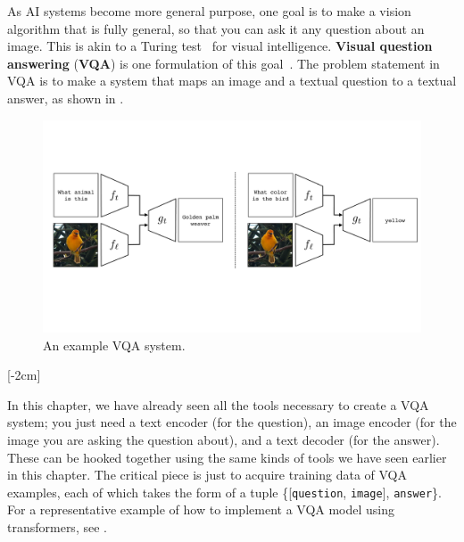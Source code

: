 As AI systems become more general purpose, one goal is to make a vision algorithm that is fully general, so that you can ask it any question about an image. This is akin to a Turing test~\cite{turing2009computing} for visual intelligence. \textbf{Visual question answering} (\textbf{VQA}) is one formulation of this goal~\cite{antol2015vqa}. The problem statement in VQA is to make a system that maps an image and a textual question to a textual answer, as shown in \fig{\ref{fig:vision_and_language:VQA_examples}}.
\begin{figure}
    \centerline{
        \includegraphics[width=1.0\linewidth]{figures/vision_and_language/VQA_examples.pdf}
    }
    \caption{An example VQA system.}
    \label{fig:vision_and_language:VQA_examples}
\end{figure}

[-2cm]

In this chapter, we have already seen all the tools necessary to create a VQA system; you just need a text encoder (for the question), an image encoder (for the image you are asking the question about), and a text decoder (for the answer). These can be hooked together using the same kinds of tools we have seen earlier in this chapter. The critical piece is just to acquire training data of VQA examples, each of which takes the form of a tuple \{[\texttt{question}, \texttt{image}], \texttt{answer}\}. For a representative example of how to implement a VQA model using transformers, see \cite{li2023blip2}.

